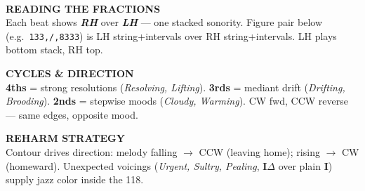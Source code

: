 \documentclass[letterpaper,10pt]{article}
\begin{document}
\vspace{1mm}
\noindent{\color{ink}\rule{\linewidth}{0.6pt}}\\[0.3mm]
\noindent\begin{minipage}[t]{0.32\linewidth}
{\fontsize{6.5}{8}\selectfont\ttfamily\color{accent}\bfseries READING THE FRACTIONS}\\[-0.3mm]
{\fontsize{7.5}{9}\selectfont
Each beat shows {\color{rhcol}\textbf{\textit{RH}}} over {\color{lhcol}\textbf{\textit{LH}}} — one stacked sonority. Figure pair below (e.g.\ \texttt{133,/,8333}) is {\color{lhcol}LH string+intervals} over {\color{rhcol}RH string+intervals}. LH plays bottom stack, RH top.}
\end{minipage}\hfill
\begin{minipage}[t]{0.32\linewidth}
{\fontsize{6.5}{8}\selectfont\ttfamily\color{accent}\bfseries CYCLES \& DIRECTION}\\[-0.3mm]
{\fontsize{7.5}{9}\selectfont
\textcolor{leafyellow!80!black}{\textbf{4ths}} = strong resolutions (\textit{Resolving, Lifting}). \textcolor{leafred}{\textbf{3rds}} = mediant drift (\textit{Drifting, Brooding}). \textcolor{leafcyan!80!black}{\textbf{2nds}} = stepwise moods (\textit{Cloudy, Warming}). CW fwd, CCW reverse — same edges, opposite mood.}
\end{minipage}\hfill
\begin{minipage}[t]{0.32\linewidth}
{\fontsize{6.5}{8}\selectfont\ttfamily\color{accent}\bfseries REHARM STRATEGY}\\[-0.3mm]
{\fontsize{7.5}{9}\selectfont
Contour drives direction: melody falling $\to$ CCW (leaving home); rising $\to$ CW (homeward). Unexpected voicings (\textit{Urgent, Sultry, Pealing}, \textbf{I}$\Delta$ over plain \textbf{I}) supply jazz color inside the 118.}
\end{minipage}

\vspace{0.8mm}
\end{document}
